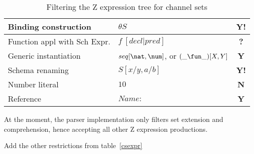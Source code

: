 \documentclass{article}
\begin{document}
\begin{table}[h]
\begin{tabular}{|l|l|c|}
\hline
Binding construction & $\theta S$ & \textbf{Y!} \\
\hline
Function appl with Sch Expr. & $f~[ decl | pred ]$ & \textbf{?} \\
\hline
Generic instantiation & $seq[\nat, \num]$, or $(\_ \fun \_)[X, Y]$ & \textbf{Y} \\
\hline
Schema renaming & $S[x/y, a/b]$ & \textbf{Y!} \\
\hline
Number literal & $10$ & \textbf{N} \\
\hline
Reference & $Name:  $ & \textbf{Y} \\
\hline
\end{tabular}
\caption{Filtering the Z expression tree for channel sets}
\end{table}
%
At the moment, the parser implementation only filters set extension and comprehension, hence
accepting all other Z expression productions.

\begin{issue}
   Add the other restrictions from table~\ref{csexpr}
\end{issue}

%
%
%
%
%
%
\end{document}
